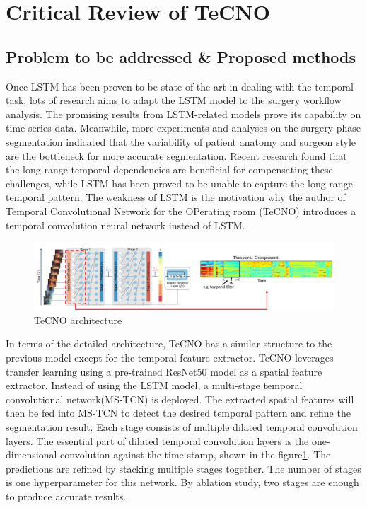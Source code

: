 \documentclass[11pt]{article} \usepackage[top=1in, bottom=1in, left=1in, right=1in]{geometry}
\begin{document}
\section{Critical Review of TeCNO}
\subsection{Problem to be addressed & Proposed methods}
Once LSTM has been proven to be state-of-the-art in dealing with the temporal task, lots of research aims to adapt the LSTM model to the surgery workflow analysis. The promising results from LSTM-related models prove its capability on time-series data. Meanwhile, more experiments and analyses on the surgery phase segmentation indicated that the variability of patient anatomy and surgeon style are the bottleneck for more accurate segmentation. Recent research found that the long-range temporal dependencies are beneficial for compensating these challenges, while LSTM has been proved to be unable to capture the long-range temporal pattern. The weakness of LSTM  is the motivation why the author of Temporal Convolutional Network for the OPerating room (TeCNO) introduces a temporal convolution neural network instead of LSTM. 

\begin{figure}[H]
  \includegraphics[width=\textwidth]{TeCNO_arch.png}
  \centering
  \caption{ TeCNO architecture \cite{TeCNO}}
  \label{fig:tecno_arch}
\end{figure}

In terms of the detailed architecture, TeCNO has a similar structure to the previous model except for the temporal feature extractor. TeCNO leverages transfer learning using a pre-trained ResNet50 model as a spatial feature extractor. Instead of using the LSTM model, a multi-stage temporal convolutional network(MS-TCN) is deployed. The extracted spatial features will then be fed into MS-TCN to detect the desired temporal pattern and refine the segmentation result. Each stage consists of multiple dilated temporal convolution layers. The essential part of dilated temporal convolution layers is the one-dimensional convolution against the time stamp, shown in the figure\ref{fig:tecno_arch}. The predictions are refined by stacking multiple stages together. The number of stages is one hyperparameter for this network. By ablation study, two stages are enough to produce accurate results. 
\end{document}
